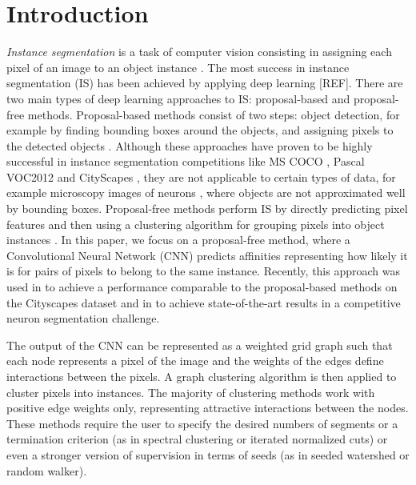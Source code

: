 
\section{Introduction}

\emph{Instance segmentation} is a task of computer vision consisting in assigning each pixel of an image to an object instance . The most success in instance segmentation (IS) has been achieved by applying deep learning [REF]. There are two main types of deep learning approaches to IS: proposal-based and proposal-free methods. Proposal-based methods consist of two steps: object detection, for example by finding bounding boxes around the objects, and assigning pixels to the detected objects . Although these approaches have proven to be highly successful in instance segmentation competitions like MS COCO \cite{lin2014microsoft}, Pascal VOC2012 \cite{everingham2010pascal} and CityScapes \cite{cordts2016cityscapes}, they are not applicable to certain types of data, for example microscopy images of neurons , where objects are not approximated well by bounding boxes. 
Proposal-free methods perform IS by directly predicting pixel features and then using a clustering algorithm for grouping pixels into object instances . In this paper, we focus on a proposal-free method, where a Convolutional Neural Network (CNN) predicts affinities representing how likely it is for pairs of pixels to belong to the same instance. Recently, this approach was used in \cite{liu2018affinity} to achieve a performance comparable to the proposal-based methods on the Cityscapes dataset and in \cite{wolf2018mutex} to achieve state-of-the-art results in a competitive neuron segmentation challenge. 

The output of the CNN can be represented as a weighted grid graph such that each node represents a pixel of the image and the weights of the edges define interactions between the pixels. A graph clustering algorithm is then applied to cluster pixels into instances. The majority of clustering methods work with positive edge weights only, representing attractive interactions between the nodes. These methods require the user to specify the desired numbers of segments or a termination criterion (as in spectral clustering or iterated normalized cuts) or even a stronger version of supervision in terms of seeds (as in seeded watershed or random walker).  


